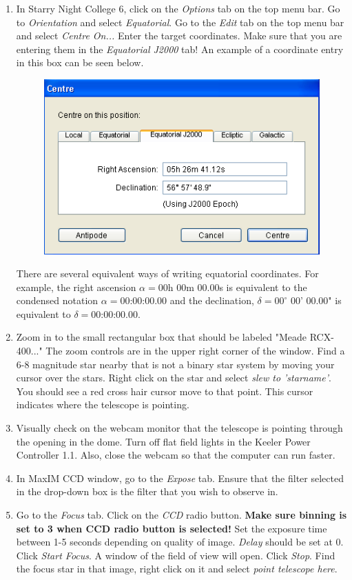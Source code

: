 \documentclass[11pt]{report}
\begin{document}
\begin{enumerate}
\item In Starry Night College 6, click on the \emph{Options} tab on the top menu bar. Go to \emph{Orientation} and select \emph{Equatorial}. Go to the \emph{Edit} tab on the top menu bar and select \emph{Centre On...} Enter the target coordinates. Make sure that you are entering them in the \emph{Equatorial J2000} tab! An example of a coordinate entry in this box can be seen below.
\begin{figure}[!h]
\begin{center}
\includegraphics[totalheight=.2\textheight]{centreon.png}
\end{center}
\end{figure}
There are several equivalent ways of writing equatorial coordinates. For example, the right ascension $\alpha=00$h 00m 00.00s is equivalent to the condensed notation $\alpha=00$:00:00.00 and the declination, $\delta=00^{\circ}$ 00' 00.00" is equivalent to $\delta=00$:00:00.00.
\item Zoom in to the small rectangular box that should be labeled "Meade RCX-400..." The zoom controls are in the upper right corner of the window. Find a 6-8 magnitude star nearby that is not a binary star system by moving your cursor over the stars. Right click on the star and select \emph{slew to 'starname'}. You should see a red cross hair cursor move to that point. This cursor indicates where the telescope is pointing. 
\item Visually check on the webcam monitor that the telescope is pointing through the opening in the dome. Turn off flat field lights in the Keeler Power Controller 1.1. Also, close the webcam so that the computer can run faster.
\item In MaxIM CCD window, go to the \emph{Expose} tab. Ensure that the filter selected in the drop-down box is the filter that you wish to observe in.
\item Go to the \emph{Focus} tab. Click on the \emph{CCD} radio button. {\bf Make sure binning is set to 3 when CCD radio button is selected!} Set the exposure time between 1-5 seconds depending on quality of image. \emph{Delay} should be set at 0. Click \emph{Start Focus}. A window of the field of view will open. Click \emph{Stop}. Find the focus star in that image, right click on it and select \emph{point telescope here}.

\end{enumerate}
\end{document}
